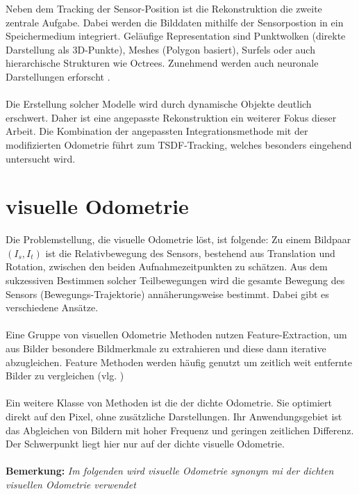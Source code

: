 \documentclass[12pt,DIV=15,BCOR=15mm,twoside,headsepline,abstract=true,listof=totoc,bibliography=totoc]{scrreprt}
\theoremstyle{remark}    %
\begin{document}
    Neben dem Tracking der Sensor-Position ist die Rekonstruktion die zweite zentrale Aufgabe. Dabei werden die Bilddaten mithilfe der 
    Sensorpostion in ein Speichermedium integriert. Geläufige Representation sind Punktwolken (direkte Darstellung als 3D-Punkte), 
    Meshes (Polygon basiert), Surfels oder auch hierarchische Strukturen wie Octrees. Zunehmend werden auch neuronale Darstellungen erforscht
    \cite{anurev}.\\\\
    Die Erstellung solcher Modelle wird durch dynamische Objekte deutlich erschwert. Daher ist eine angepasste Rekonstruktion ein weiterer Fokus dieser Arbeit.
    Die Kombination der angepassten Integrationsmethode mit der modifizierten Odometrie führt zum \ac{TSDF}-Tracking, welches besonders 
    eingehend untersucht wird.

    \section{visuelle Odometrie}
    Die Problemstellung, die visuelle Odometrie löst, ist folgende: Zu einem Bildpaar $(I_s,I_t)$ ist die Relativbewegung des Sensors, bestehend aus Translation 
    und Rotation, zwischen den beiden Aufnahmezeitpunkten zu schätzen. 
    Aus dem sukzessiven Bestimmen solcher Teilbewegungen wird die gesamte Bewegung des Sensors (Bewegungs-Trajektorie) annäherungsweise bestimmt. 
    Dabei gibt es verschiedene Ansätze.\\\\
    Eine Gruppe von visuellen Odometrie Methoden nutzen Feature-Extraction, um aus Bilder besondere Bildmerkmale zu extrahieren und diese dann iterative abzugleichen. 
    Feature Methoden werden häufig genutzt um zeitlich weit
    entfernte Bilder zu vergleichen (vlg. \cite{opencv_matcher_tutorial,Mur_Artal_2015})\\\\
    Ein weitere Klasse von Methoden ist die der dichte Odometrie. Sie optimiert direkt auf den Pixel, ohne zusätzliche Darstellungen. Ihr Anwendungsgebiet ist 
    das Abgleichen von Bildern mit hoher Frequenz und geringen zeitlichen Differenz. Der Schwerpunkt liegt hier nur auf der dichte visuelle Odometrie.\\\\ 
    \textbf{Bemerkung:} \emph{Im folgenden wird visuelle Odometrie synonym mi der dichten visuellen Odometrie verwendet}\\\\
\end{document}
